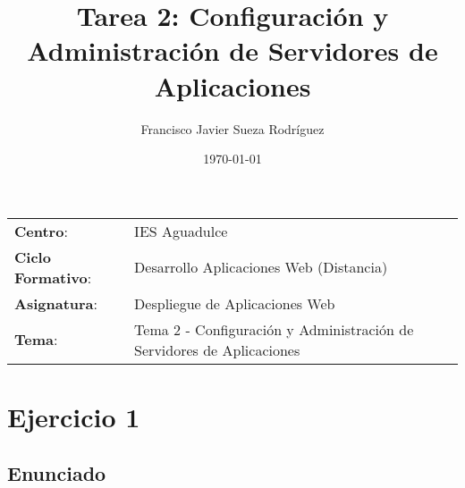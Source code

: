 


\title{
\vspace{10ex}
\normalfont \normalsize
\huge \textbf{Tarea 2: Configuración y Administración de Servidores de Aplicaciones}
}
\author{Francisco Javier Sueza Rodríguez}
\date{\normalsize\today}




\maketitle

\thispagestyle{empty}

\vspace{68ex}

\begin{center}
    \begin{tabular}{l l}
        \textbf{Centro}: & IES Aguadulce \\
        \textbf{Ciclo Formativo}: & Desarrollo Aplicaciones Web (Distancia)\\
        \textbf{Asignatura}: & Despliegue de Aplicaciones Web\\
        \textbf{Tema}: & Tema 2 - Configuración y Administración de Servidores de Aplicaciones\\
    \end{tabular}
\end{center}

\newpage

\tableofcontents

\newpage


\section{Ejercicio 1}

\subsection{Enunciado}

